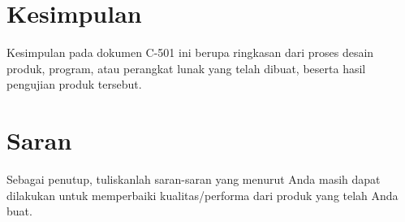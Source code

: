 
\section{Kesimpulan}
\label{sec:kesimpulan}

    Kesimpulan pada dokumen C-501 ini berupa ringkasan dari proses desain produk, program, atau perangkat lunak yang telah dibuat, beserta hasil pengujian produk tersebut.

\section{Saran}
\label{sec:saran}

    Sebagai penutup, tuliskanlah saran-saran yang menurut Anda masih dapat dilakukan untuk memperbaiki kualitas/performa dari produk yang telah Anda buat.